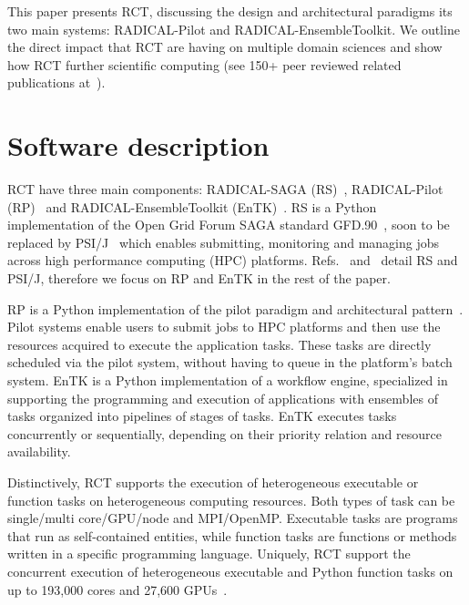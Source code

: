 \documentclass[preprint,12pt, a4paper]{elsarticle}
\begin{document}
This paper presents RCT, discussing the design and architectural paradigms its
two main systems: RADICAL-Pilot and RADICAL-EnsembleToolkit. We outline
the direct impact that RCT are having on multiple domain sciences
and show how RCT further scientific computing (see 150+ peer reviewed related
publications at~\cite{radical-web-pub,scholar-search}).



\section{Software description}\label{sec:description}


RCT have three main components: RADICAL-SAGA (RS)~\cite{merzky2015saga},
RADICAL-Pilot (RP)~\cite{merzky2018using} and RADICAL-EnsembleToolkit
(EnTK)~\cite{balasubramanian2016ensemble,balasubramanian2018harnessing}. RS is a
Python implementation of the Open Grid Forum SAGA standard
GFD.90~\cite{tom2006saga}, soon to be replaced by
PSI/J~\cite{hategan2023psi} which enables submitting, monitoring and managing
jobs across high performance computing (HPC) platforms.
Refs.~\cite{merzky2015saga} and~\cite{hategan2023psi} detail RS and PSI/J,
therefore we focus on RP and EnTK in the rest of the paper.

RP is a Python implementation of the pilot paradigm and architectural
pattern~\cite{turilli2018comprehensive,luckow2012p}. Pilot systems enable users
to submit jobs to HPC platforms and then use the resources acquired to execute
the application tasks. These tasks are directly scheduled via the pilot system,
without having to queue in the platform's batch system. EnTK is a Python
implementation of a workflow engine, specialized in supporting the programming
and execution of applications with ensembles of tasks organized into pipelines
of stages of tasks. EnTK executes tasks concurrently or sequentially, depending
on their priority relation and resource availability.

Distinctively, RCT supports the execution of heterogeneous executable or
function tasks on heterogeneous computing resources. Both types of task can be
single/multi core/GPU/node and MPI/OpenMP\@. Executable tasks are programs that
run as self-contained entities, while function tasks are functions or methods
written in a specific programming language. Uniquely, RCT support the concurrent
execution of heterogeneous executable and Python function tasks on up to 193,000
cores and 27,600 GPUs~\cite{merzky2021design}.
\end{document}
